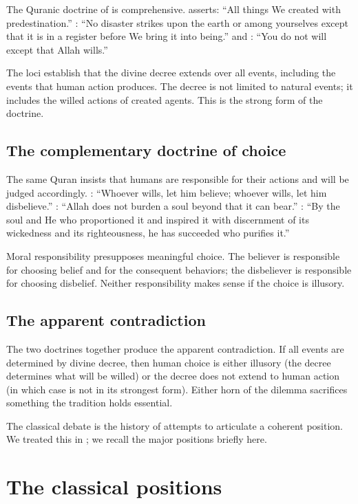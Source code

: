 The Quranic doctrine of  is comprehensive. 
asserts: ``All things We created with predestination.'' :
``No disaster strikes upon the earth or among yourselves except
that it is in a register before We bring it into being.'' 
and : ``You do not will except that Allah wills.''

The loci establish that the divine decree extends over all events,
including the events that human action produces. The decree is not
limited to natural events; it includes the willed actions of
created agents. This is the strong form of the doctrine.

\subsection{The complementary doctrine of choice}

The same Quran insists that humans are responsible for their
actions and will be judged accordingly. : ``Whoever
wills, let him believe; whoever wills, let him disbelieve.''
: ``Allah does not burden a soul beyond that it can
bear.'' : ``By the soul and He who proportioned it
and inspired it with discernment of its wickedness and its
righteousness, he has succeeded who purifies it.''

Moral responsibility presupposes meaningful choice. The believer
is responsible for choosing belief and for the consequent
behaviors; the disbeliever is responsible for choosing disbelief.
Neither responsibility makes sense if the choice is illusory.

\subsection{The apparent contradiction}

The two doctrines together produce the apparent contradiction. If
all events are determined by divine decree, then human choice is
either illusory (the decree determines what will be willed) or
the decree does not extend to human action (in which case
 is not in its strongest form). Either horn of the
dilemma sacrifices something the tradition holds essential.

The classical  debate is the history of attempts to
articulate a coherent position. We treated this in
; we recall the major positions briefly here.

\section{The classical positions}
\label{sec:qad-classical}

